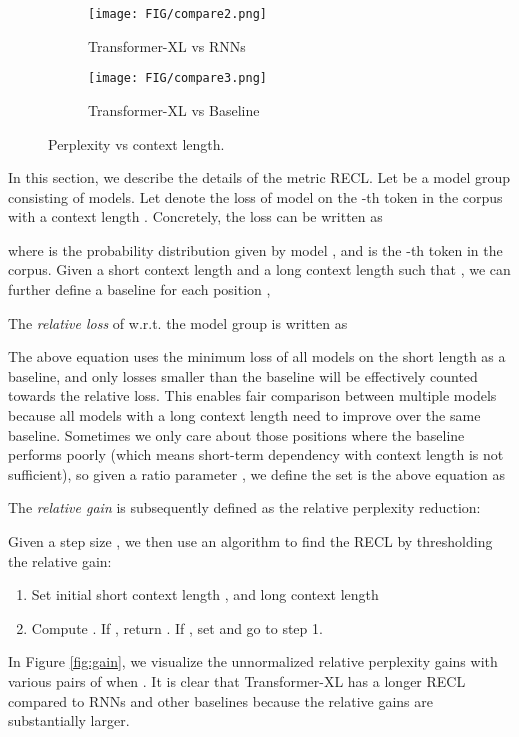 \documentclass[11pt,a4paper]{article}
\begin{document}
\begin{figure}[!h]
	\begin{subfigure}[b]{0.5\textwidth}
		\texttt{[image: FIG/compare2.png]}
		\caption{Transformer-XL vs RNNs}
		\label{fig:vsrnn}
	\end{subfigure}
	\begin{subfigure}[b]{0.5\textwidth}
		\texttt{[image: FIG/compare3.png]}
		\caption{Transformer-XL vs Baseline}
		\label{fig:vsbase}
	\end{subfigure}
	\caption{Perplexity vs context length.}
	\label{fig:context}
\end{figure}

In this section, we describe the details of the metric RECL. Let  be a model group consisting of  models. Let  denote the loss of model  on the -th token in the corpus with a context length . Concretely, the loss can be written as

where  is the probability distribution given by model , and  is the -th token in the corpus. Given a short context length  and a long context length  such that , we can further define a baseline for each position ,


The \textit{relative loss} of  w.r.t. the model group  is written as

The above equation uses the minimum loss of all models on the short length  as a baseline, and only losses smaller than the baseline will be effectively counted towards the relative loss. This enables fair comparison between multiple models because all models with a long context length  need to improve over the same baseline. Sometimes we only care about those positions where the baseline performs poorly (which means short-term dependency with context length  is not sufficient), so given a ratio parameter , we define the set  is the above equation as


The \textit{relative gain} is subsequently defined as the relative perplexity reduction:


Given a step size , we then use an algorithm to find the RECL by thresholding the relative gain:
\begin{enumerate}
	\item Set initial short context length , and long context length 
	\item Compute . If , return . If , set  and go to step 1.
\end{enumerate}

In Figure \ref{fig:gain}, we visualize the unnormalized relative perplexity gains  with various pairs of  when . It is clear that Transformer-XL has a longer RECL compared to RNNs and other baselines because the relative gains are substantially larger.
\end{document}
